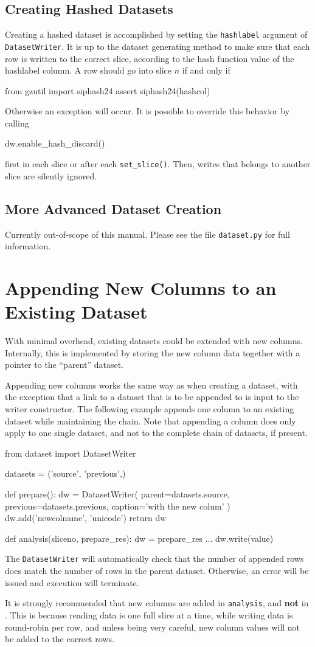 \subsection{Creating Hashed Datasets}
Creating a hashed dataset is accomplished by setting
the \texttt{hashlabel} argument of \texttt{DatasetWriter}.  It is up
to the dataset generating method to make sure that each row is written
to the correct slice, according to the hash function value of the
hashlabel column.  A row should go into slice $n$ if and only if
\begin{python}
from gzutil import siphash24
assert siphash24(hashcol) %
\end{python}
Otherwise an exception will occur.  It is possible to override this
behavior by calling
\begin{python}
dw.enable_hash_discard()
\end{python}
first in each slice or after each \texttt{set\_slice()}.  Then, writes
that belongs to another slice are silently ignored.



\subsection{More Advanced Dataset Creation}
Currently out-of-scope of this manual.  Please see the file
\texttt{dataset.py} for full information.


\clearpage
\section{Appending New Columns to an Existing Dataset}

With minimal overhead, existing datasets could be extended with new
columns.  Internally, this is implemented by storing the new column
data together with a pointer to the ``parent'' dataset.

Appending new columns works the same way as when creating a dataset,
with the exception that a link to a dataset that is to be appended to
is input to the writer constructor.  The following example appends one
column to an existing dataset while maintaining the chain.  Note that
appending a column does only apply to one single dataset, and not to
the complete chain of datasets, if present.
\begin{python}
from dataset import DatasetWriter

datasets = ('source', 'previous',)

def prepare():
    dw = DatasetWriter(
        parent=datasets.source,
        previous=datasets.previous,
        caption='with the new colum'
    )
    dw.add('newcolname', 'unicode')
    return dw

def analysis(sliceno, prepare_res):
    dw = prepare_res
    ...
    dw.write(value)
\end{python}
The \texttt{DatasetWriter} will automatically check that the number of
appended rows does match the number of rows in the parent dataset.
Otherwise, an error will be issued and execution will terminate.

It is strongly recommended that new columns are added
in \texttt{analysis}, and \textbf{not} in \synthesis.  This is because
reading data is one full slice at a time, while writing data is
round-robin per row, and unless being very careful, new column values
will not be added to the correct rows.
